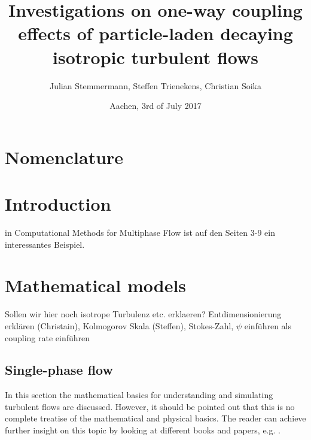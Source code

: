 \documentclass[a4paper,10pt]{article}
\title{Investigations on one-way coupling effects of particle-laden decaying isotropic turbulent flows}
\author{Julian Stemmermann, Steffen Trienekens, Christian Soika}
\date{Aachen, 3rd of July 2017}
\numberwithin{equation}{section} %
\begin{document}
\maketitle

\pagebreak

\tableofcontents{} %
 
\pagebreak

\section{Nomenclature}
\printnomenclature
\pagebreak

\section{Introduction}
in Computational Methods for Multiphase Flow ist auf den Seiten 3-9 ein interessantes Beispiel.
\pagebreak
\section{Mathematical models}
\pagebreak
Sollen wir hier noch isotrope Turbulenz etc. erklaeren? Entdimensionierung erklären (Christain), Kolmogorov Skala (Steffen), Stokes-Zahl, $\psi$ einführen als coupling rate einführen
\subsection{Single-phase flow} %
In this section the mathematical basics for understanding and simulating turbulent flows are discussed. However, it should be pointed out that this is no
complete treatise of the mathematical and physical basics. The reader can achieve further insight on this topic by looking at different books and papers, 
e.g. \cite{turbulentFlows}.
\newline
\end{document}
